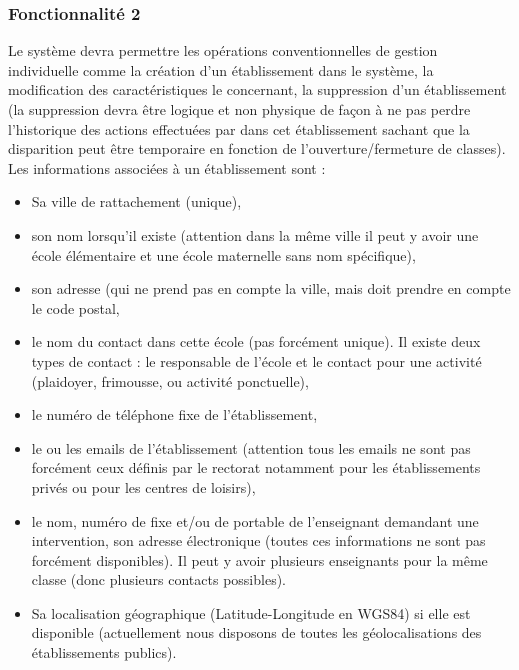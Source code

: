 \subsubsection{Fonctionnalité 2}
Le système devra permettre les opérations conventionnelles de gestion individuelle comme la création d'un établissement dans le système, la modification des
caractéristiques le concernant, la suppression d'un établissement (la suppression devra être logique et non physique de façon à ne pas perdre l'historique des actions effectuées par dans cet établissement sachant que la disparition peut être temporaire en fonction de l'ouverture/fermeture de classes). 
\\
Les informations associées à un établissement sont :
\begin{itemize}
\item Sa ville de rattachement (unique), \\
\item son nom lorsqu'il existe (attention dans la même ville il peut y avoir une école élémentaire
et une école maternelle sans nom spécifique), \\
\item son adresse (qui ne prend pas en compte la ville, mais doit prendre en compte le code postal, \\
\item le nom du contact dans cette école (pas forcément unique). Il existe deux types de contact :
le responsable de l'école et le contact pour une activité (plaidoyer, frimousse, ou activité ponctuelle), \\
\item le numéro de téléphone fixe de l'établissement, \\
\item le ou les emails de l'établissement (attention tous les emails ne sont pas forcément ceux définis par le rectorat notamment pour les établissements privés ou pour les centres de loisirs), \\
\item le nom, numéro de fixe et/ou de portable de l'enseignant demandant une intervention, son adresse électronique (toutes ces informations ne sont pas forcément disponibles). Il peut y avoir plusieurs enseignants pour la même classe (donc plusieurs contacts possibles).\\
\item Sa localisation géographique (Latitude-Longitude en WGS84) si elle est disponible
(actuellement nous disposons de toutes les géolocalisations des établissements publics).\\

\end{itemize}

